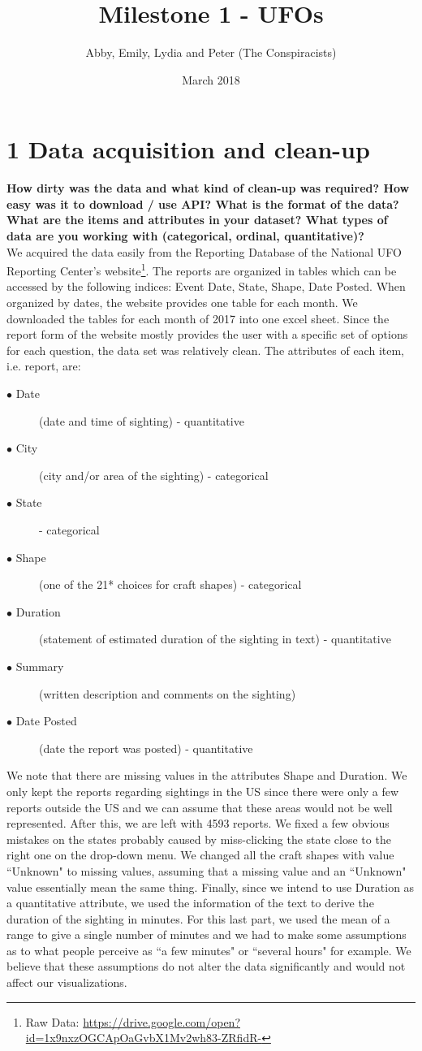 \documentclass{neu_handout}
\title{Milestone 1 - UFOs}
\author{Abby, Emily, Lydia and Peter (The Conspiracists)}
\date{March 2018}
\begin{document}
\section*{1 Data acquisition and clean-up}

\textbf{How dirty was the data and what kind of clean-up was required? How
easy was it to download / use API? What is the format of the data? What are the
items and attributes in your dataset? What types of data are you working with
(categorical, ordinal, quantitative)?}\\

We acquired the data easily from the Reporting Database of the National UFO Reporting Center's website\footnote{Raw Data: \url{https://drive.google.com/open?id=1x9nxzOGCApOaGvbX1Mv2wh83-ZRfidR-}}. The reports are organized in tables which can be accessed by the following indices: Event Date, State, Shape, Date Posted. When organized by dates, the website provides one table for each month. We downloaded the tables for each month of 2017 into one excel sheet. Since the report form of the website mostly provides the user with a specific set of options for each question, the data set was relatively clean. The attributes of each item, i.e. report, are:

\begin{description}
  \item[$\bullet$ Date] (date and time of sighting) - quantitative
  \item[$\bullet$ City] (city and/or area of the sighting) - categorical
  \item[$\bullet$ State] - categorical
  \item[$\bullet$ Shape] (one of the 21* choices for craft shapes) - categorical
  \item[$\bullet$ Duration] (statement of estimated duration of the sighting in text) - quantitative
  \item[$\bullet$ Summary] (written description and comments on the sighting)
  \item[$\bullet$ Date Posted] (date the report was posted) - quantitative
\end{description}

We note that there are missing values in the attributes Shape and Duration. We only kept the reports regarding sightings in the US since there were only a few reports outside the US and we can assume that these areas would not be well represented. After this, we are left with 4593 reports. We fixed a few obvious mistakes on the states probably caused by miss-clicking the state close to the right one on the drop-down menu. We changed all the craft shapes with value ``Unknown" to missing values, assuming that a missing value and an ``Unknown" value essentially mean the same thing. Finally, since we intend to use Duration as a quantitative attribute, we used the information of the text to derive the duration of the sighting in minutes. For this last part, we used the mean of a range to give a single number of minutes and we had to make some assumptions as to what people perceive as ``a few minutes" or ``several hours" for example. We believe that these assumptions do not alter the data significantly and would not affect our visualizations.
\end{document}
